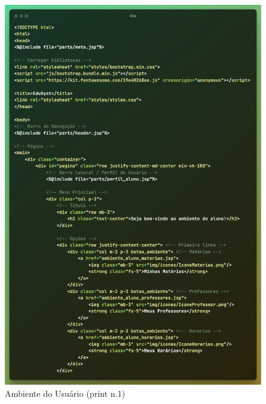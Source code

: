\documentclass[main.tex]{subfiles}
\begin{document}
\begin{figure}[H]
    \centering
    \includegraphics[scale=0.63]{imagens/code_scrs/6-ambienteSite}
    \caption{Ambiente do Usuário (print n.1)}
\end{figure}
\end{document}
